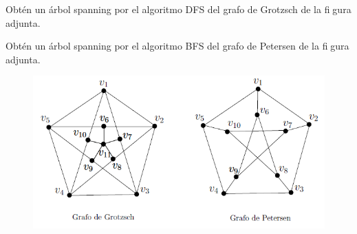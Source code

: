 \documentclass[twoside]{article}
\begin{document}
\begin{ejercicio}{1.10}
Obtén un árbol spanning por el algoritmo DFS del grafo de Grotzsch de la figura adjunta.
\end{ejercicio}
\begin{solucion}

\end{solucion}

\newpage

\begin{ejercicio}{1.11}
Obtén un árbol spanning por el algoritmo BFS del grafo de Petersen de la figura adjunta.
\end{ejercicio}
\begin{solucion}



\end{solucion}

\newpage

\begin{figure}[h!]
\includegraphics[scale=0.8]{Rel1}
\end{figure}
%
%
%
%
\end{document}

